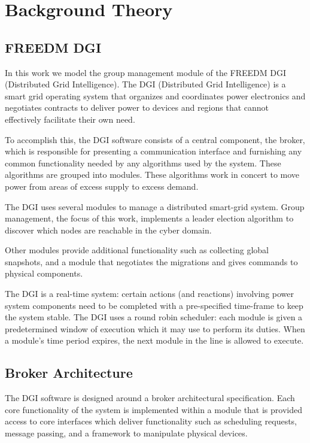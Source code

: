 \chapter{Background Theory}

\section{FREEDM DGI}

In this work we model the group management module of the FREEDM DGI (Distributed Grid Intelligence).
The DGI (Distributed Grid Intelligence) is a smart grid operating system
that organizes and coordinates power electronics and negotiates contracts to
deliver power to devices and regions that cannot effectively facilitate their own need.

To accomplish this, the DGI software consists of a central component, the
broker, which is responsible for presenting a communication interface and
furnishing any common functionality needed by any algorithms used by the
system. These algorithms are grouped into modules. These algorithms work in
concert to move power from areas of excess supply to excess demand.

The DGI uses several modules to manage a distributed smart-grid system. Group
management, the focus of this work, implements a leader election algorithm to
discover which nodes are reachable in the cyber domain.

Other modules provide additional functionality such as collecting global
snapshots, and a module that negotiates the migrations and gives commands to
physical components.

The DGI is a real-time system: certain actions (and reactions) involving power
system components need to be completed with a pre-specified time-frame to keep
the system stable. The DGI uses a round robin scheduler: each module is given
a predetermined window of execution which it may use to perform its duties. When
a module's time period expires, the next module in the line is allowed to
execute.

\section{Broker Architecture}

The DGI software is designed around a broker architectural specification.
Each core functionality of the system is implemented within a module that is
provided access to core interfaces which deliver functionality such as
scheduling requests, message passing, and a framework to manipulate physical
devices.

